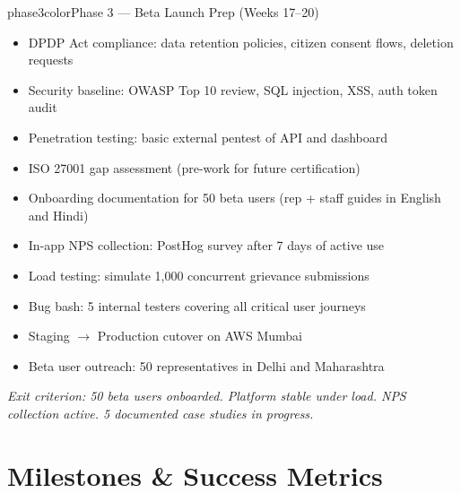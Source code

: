 \documentclass[12pt, a4paper]{article}
\begin{document}
\vspace{0.5em}

\begin{phasebox}{phase3color}{Phase 3 --- Beta Launch Prep \quad (Weeks 17--20)}
\begin{itemize}[leftmargin=1.2em, itemsep=0.15em]
    \item DPDP Act compliance: data retention policies, citizen consent flows, deletion requests
    \item Security baseline: OWASP Top 10 review, SQL injection, XSS, auth token audit
    \item Penetration testing: basic external pentest of API and dashboard
    \item ISO 27001 gap assessment (pre-work for future certification)
    \item Onboarding documentation for 50 beta users (rep + staff guides in English and Hindi)
    \item In-app NPS collection: PostHog survey after 7 days of active use
    \item Load testing: simulate 1,000 concurrent grievance submissions
    \item Bug bash: 5 internal testers covering all critical user journeys
    \item Staging $\to$ Production cutover on AWS Mumbai
    \item Beta user outreach: 50 representatives in Delhi and Maharashtra
\end{itemize}
\textit{Exit criterion: 50 beta users onboarded. Platform stable under load. NPS collection active. 5 documented case studies in progress.}
\end{phasebox}

\newpage

\section{Milestones \& Success Metrics}
\end{document}
